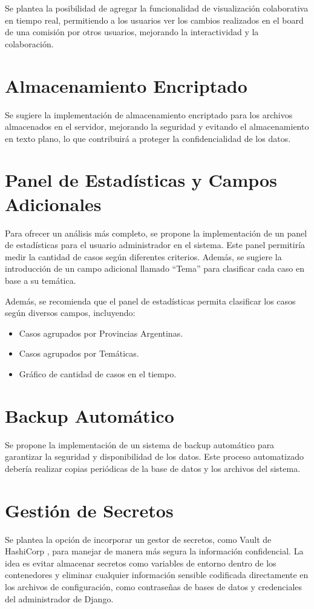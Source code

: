 Se plantea la posibilidad de agregar la funcionalidad de visualización colaborativa en tiempo real, permitiendo a los usuarios ver los cambios realizados en el board de una comisión por otros usuarios, mejorando la interactividad y la colaboración.

\section{Almacenamiento Encriptado}

Se sugiere la implementación de almacenamiento encriptado para los archivos almacenados en el servidor, mejorando la seguridad y evitando el almacenamiento en texto plano, lo que contribuirá a proteger la confidencialidad de los datos.

\section{Panel de Estadísticas y Campos Adicionales}

Para ofrecer un análisis más completo, se propone la implementación de un panel de estadísticas para el usuario administrador en el sistema. Este panel permitiría medir la cantidad de casos según diferentes criterios. Además, se sugiere la introducción de un campo adicional llamado ``Tema'' para clasificar cada caso en base a su temática.

Además, se recomienda que el panel de estadísticas permita clasificar los casos según diversos campos, incluyendo:
\begin{itemize}
\item Casos agrupados por Provincias Argentinas.
\item Casos agrupados por Temáticas.
\item Gráfico de cantidad de casos en el tiempo.
\end{itemize}

\section{Backup Automático}
Se propone la implementación de un sistema de backup automático para garantizar la seguridad y disponibilidad de los datos. Este proceso automatizado debería realizar copias periódicas de la base de datos y los archivos del sistema.

\section{Gestión de Secretos}
Se plantea la opción de incorporar un gestor de secretos, como Vault de HashiCorp \cite{voult}, para manejar de manera más segura la información confidencial. La idea es evitar almacenar secretos como variables de entorno dentro de los contenedores y eliminar cualquier información sensible codificada directamente en los archivos de configuración, como contraseñas de bases de datos y credenciales del administrador de Django.
